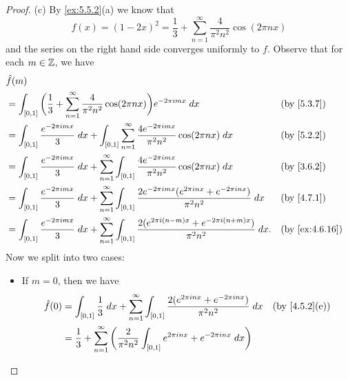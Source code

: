 \begin{proof}{(c)}
  By \cref{ex:5.5.2}(a) we know that
  \[
    f(x) = (1 - 2x)^2 = \dfrac{1}{3} + \sum_{n = 1}^\infty \dfrac{4}{\pi^2 n^2} \cos(2 \pi n x)
  \]
  and the series on the right hand side converges uniformly to \(f\).
  Observe that for each \(m \in \mathbb{Z}\), we have
  \begin{align*}
     & \hat{f}(m)                                                                                                                                                                                                  \\
     & = \int_{[0, 1]} \bigg(\dfrac{1}{3} + \sum_{n = 1}^\infty \dfrac{4}{\pi^2 n^2} \cos(2 \pi n x)\bigg) e^{-2 \pi i m x} \; dx                                                &  & \text{(by \cref{5.3.7})}     \\
     & = \int_{[0, 1]} \dfrac{e^{- 2 \pi i m x}}{3} \; dx + \int_{[0, 1]} \sum_{n = 1}^\infty \dfrac{4 e^{- 2 \pi i m x}}{\pi^2 n^2} \cos(2 \pi n x) \; dx                       &  & \text{(by \cref{5.2.2})}     \\
     & = \int_{[0, 1]} \dfrac{e^{- 2 \pi i m x}}{3} \; dx + \sum_{n = 1}^\infty \int_{[0, 1]} \dfrac{4 e^{- 2 \pi i m x}}{\pi^2 n^2} \cos(2 \pi n x) \; dx                       &  & \text{(by \cref{3.6.2})}     \\
     & = \int_{[0, 1]} \dfrac{e^{- 2 \pi i m x}}{3} \; dx + \sum_{n = 1}^\infty \int_{[0, 1]} \dfrac{2 e^{- 2 \pi i m x} (e^{2 \pi i n x} + e^{- 2 \pi i n x})}{\pi^2 n^2} \; dx &  & \text{(by \cref{4.7.1})}     \\
     & = \int_{[0, 1]} \dfrac{e^{- 2 \pi i m x}}{3} \; dx + \sum_{n = 1}^\infty \int_{[0, 1]} \dfrac{2 (e^{2 \pi i (n - m) x} + e^{- 2 \pi i (n + m) x})}{\pi^2 n^2} \; dx.      &  & \text{(by \cref{ex:4.6.16})}
  \end{align*}
  Now we split into two cases:
  \begin{itemize}
    \item If \(m = 0\), then we have
          \begin{align*}
            \hat{f}(0) & = \int_{[0, 1]} \dfrac{1}{3} \; dx + \sum_{n = 1}^\infty \int_{[0, 1]} \dfrac{2 (e^{2 \pi i n x} + e^{- 2 \pi i n x})}{\pi^2 n^2} \; dx &  & \text{(by \cref{4.5.2}(e))} \\
                       & = \dfrac{1}{3} + \sum_{n = 1}^\infty \bigg(\dfrac{2}{\pi^2 n^2} \int_{[0, 1]} e^{2 \pi i n x} + e^{- 2 \pi i n x} \; dx\bigg)                                            \\

\end{align*}
\end{itemize}
\end{proof}

